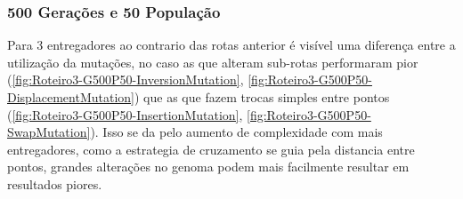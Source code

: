 \begin{center}
	\label{fig:Roteiro3-Mapa3}
\end{center}


\subsubsection{500 Gerações e 50 População}

Para 3 entregadores ao contrario das rotas anterior é visível uma diferença entre a utilização da mutações, no caso as que alteram sub-rotas performaram pior (\ref{fig:Roteiro3-G500P50-InversionMutation}, \ref{fig:Roteiro3-G500P50-DisplacementMutation}) que as que fazem trocas simples entre pontos (\ref{fig:Roteiro3-G500P50-InsertionMutation}, \ref{fig:Roteiro3-G500P50-SwapMutation}). Isso se da pelo aumento de complexidade com mais entregadores, como a estrategia de cruzamento se guia pela distancia entre pontos, grandes alterações no genoma podem mais facilmente resultar em resultados piores.

